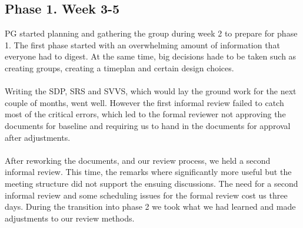 \documentclass{article}
\begin{document}
    \subsection{Phase 1. Week 3-5 \label{phase1}}
        PG started planning and gathering the group during week 2 to prepare for phase 1.
        The first phase started with an overwhelming amount of information that everyone
        had to digest. At the same time, big decisions hade to be taken such as creating groups,
        creating a timeplan and certain design choices.
        \\ \\
        Writing the SDP, SRS and SVVS, which would lay the ground work for the next couple of months, went well. However the first informal
        review failed to catch most of the critical errors, which led to the formal reviewer not approving the documents for baseline and
        requiring us to hand in the documents for approval after adjustments.
        \\ \\
        After reworking the documents, and our review process, we held a second informal review. This time, the remarks where
        significantly more useful but the meeting structure did not support the ensuing discussions. The need for a second informal review and
        some scheduling issues for the formal review cost us three days. During the transition into phase 2 we took what we had learned and
        made adjustments to our review methods.
\end{document}
